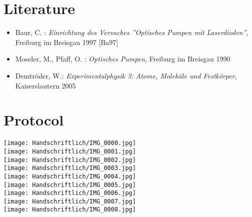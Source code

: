 \appendix
\pagebreak
\section{Literature}

\begin{itemize}
\item Baur, C. : \emph{Einrichtung des Versuches ''Optisches Pumpen mit Laserdioden''}, Freiburg im Breisgau 1997 [Ba97]
\item Moseler, M., Pfaff, O. : \emph{Optisches Pumpen}, Freiburg im Breisgau 1990
\item Demtröder, W.: \emph{Experimentalphysik 3: Atome, Moleküle und Festkörper}, Kaiserslautern 2005
\end{itemize}


\section{Protocol}
\centering \texttt{[image: Handschriftlich/IMG\_0000.jpg]}\\
\centering \texttt{[image: Handschriftlich/IMG\_0001.jpg]}\\
\centering \texttt{[image: Handschriftlich/IMG\_0002.jpg]}\\
\centering \texttt{[image: Handschriftlich/IMG\_0003.jpg]}\\
\centering \texttt{[image: Handschriftlich/IMG\_0004.jpg]}\\
\centering \texttt{[image: Handschriftlich/IMG\_0005.jpg]}\\
\centering \texttt{[image: Handschriftlich/IMG\_0006.jpg]}\\
\centering \texttt{[image: Handschriftlich/IMG\_0007.jpg]}\\
\centering \texttt{[image: Handschriftlich/IMG\_0008.jpg]}